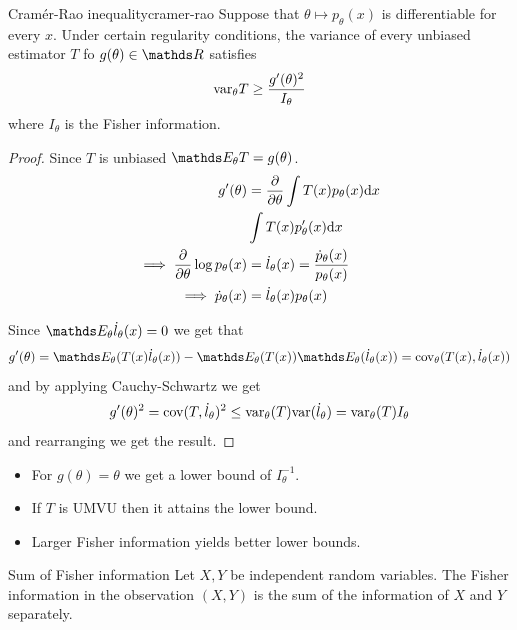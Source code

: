 \documentclass[12pt]{extarticle}
\begin{document}
\begin{theorem}{Cramér-Rao inequality}{cramer-rao}
	Suppose that $\theta \mapsto p_\theta(x)$ is differentiable for every $x$.
	Under certain regularity conditions, the variance of every unbiased estimator $T$ fo $g(\theta) \in \R$
	satisfies
	\begin{equation}
		\var_\theta T \geq \frac{g'(\theta)^2}{I_\theta}
	\end{equation}
	where $I_\theta$ is the Fisher information.
\end{theorem}
\begin{proof}
	Since $T$ is unbiased $\E_\theta T = g(\theta)$.
	\begin{align}
		g'(\theta)                             & = \pdv{\theta} \int T(x) p_\theta(x) \dd x                \\
		                                       & \int T(x) p'_\theta(x) \dd x                              \\
		\implies \pdv{\theta} \log p_\theta(x) & = \dot l_\theta(x) = \frac{\dot p_\theta(x)}{p_\theta(x)} \\
		\implies \dot p_\theta(x)              & = \dot l_\theta(x) p_\theta(x)
	\end{align}

	Since $\E_\theta \dot l_\theta(x) = 0$ we get that
	\begin{equation}
		g'(\theta) = \E_\theta(T(x) \dot l_\theta (x)) - \E_\theta(T(x)) \E_\theta(\dot l_\theta(x)) = \cov_\theta(T(x), \dot l_\theta(x))
	\end{equation}
	and by applying Cauchy-Schwartz we get
	\begin{equation}
		g'(\theta)^2 = \cov(T, \dot l_\theta)^2 \leq \var_\theta (T) \var(\dot l_\theta) = \var_\theta(T) I_\theta
	\end{equation}
	and rearranging we get the result.
\end{proof}

\begin{corollary}{}{}
	\begin{itemize}
		\item For $g(\theta) = \theta$ we get a lower bound of $I_\theta^{-1}$.
		\item If $T$ is UMVU then it attains the lower bound.
		\item Larger Fisher information yields better lower bounds.
	\end{itemize}
\end{corollary}

\begin{lemma}{Sum of Fisher information}{}
	Let $X, Y$ be independent random variables.
	The Fisher information in the observation $(X, Y)$ is the sum of the information of $X$ and $Y$ separately.
\end{lemma}
\end{document}
